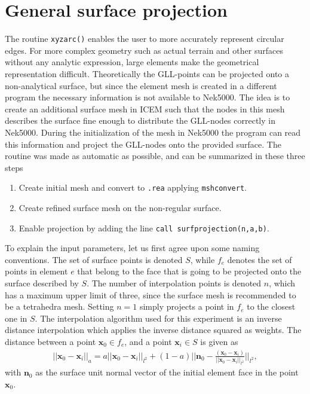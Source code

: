 \section{General surface projection}\label{surfpro}
The routine \verb|xyzarc()| enables the user to more accurately represent circular edges.
For more complex geometry such as actual terrain and other surfaces without any analytic
expression, large elements make the geometrical representation difficult. 
Theoretically the GLL-points can be projected onto a non-analytical surface, but since 
the element mesh is created in a different program the necessary information is not available
to Nek5000. The idea is to create an additional surface mesh in ICEM such
that the nodes in this mesh describes the surface fine enough to distribute the GLL-nodes correctly in Nek5000.
During the initialization of the mesh in Nek5000 the program can read this information and project the GLL-nodes onto 
the provided surface. 
The routine was made as automatic as possible, and can be summarized in these three steps
\begin{enumerate}
    \item Create initial mesh and convert to \verb|.rea| applying \verb|mshconvert|.
        \item Create refined surface mesh on the non-regular surface.
        \item Enable projection by adding the line \verb|call surfprojection(n,a,b)|.
\end{enumerate}

To explain the input parameters, let us first agree upon some naming conventions. 
The set of surface points is denoted $S$, while $f_e$ denotes the set of points 
in element $e$ that belong to the face that is going to be projected onto the surface described by $S$.
The number of interpolation points is denoted $n$, which has a maximum upper limit of three,
since the surface mesh is recommended to be a tetrahedra mesh. Setting $n=1$ simply projects 
a point in $f_e$ to the closest one in $S$.
The interpolation algorithm used for this experiment is an inverse distance interpolation
which applies the inverse distance squared as weights. The distance between a point
$\mathbf{x}_0\in f_e$, and a point $\mathbf{x}_i \in S $ is given as 
\begin{align}
    ||\mathbf{x}_0-\mathbf{x}_i||_{a} = a ||\mathbf{x}_0-\mathbf{x}_i||_{l^2}
    + (1-a)||\mathbf{n}_0 - \frac{(\mathbf{x}_0-\mathbf{x}_i)}{||\mathbf{x}_0-\mathbf{x}_i||_{l^2}}||_{l^2},
    \label{eq:distancenorm}
\end{align}
with $\mathbf{n}_0$ as the surface unit normal vector of the initial element face in the point $\mathbf{x}_0$.

